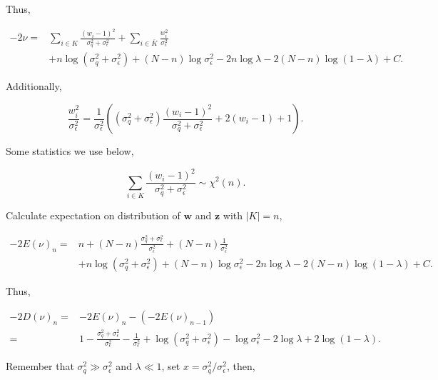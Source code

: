 Thus, 

\begin{equation}
\begin{aligned}
    -2\nu =& \sum_{i\in K}\frac{(w_i - 1)^2}{\sigma_q^2+\sigma_\epsilon^2} + \sum_{i\in \bar{K}}\frac{w_i^2}{\sigma_\epsilon^2} \\ 
    &+ n\log(\sigma_q^2+\sigma_\epsilon^2) + (N-n)\log\sigma_\epsilon^2 - 2n\log\lambda - 2(N-n)\log(1-\lambda) + C.
\end{aligned}
\end{equation}

Additionally, 

\begin{equation}
    \frac{w_i^2}{\sigma_\epsilon^2} = \frac{1}{\sigma_\epsilon^2}\left((\sigma_q^2+\sigma_\epsilon^2)\frac{(w_i - 1)^2}{\sigma_q^2+\sigma_\epsilon^2} + 2(w_i - 1) + 1\right).
\end{equation}

Some statistics we use below,

\begin{equation}
    \sum_{i\in K}\frac{(w_i - 1)^2}{\sigma_q^2+\sigma_\epsilon^2} \sim \chi^2(n).
\end{equation}

Calculate expectation on distribution of $\bm{w}$ and $\bm{z}$ with $|K|=n$, 

\begin{equation}
\begin{aligned}
    -2E(\nu)_n =& n + (N - n)\frac{\sigma_q^2+\sigma_\epsilon^2}{\sigma_\epsilon^2} + (N - n)\frac{1}{\sigma_\epsilon^2} \\ 
    &+ n\log(\sigma_q^2+\sigma_\epsilon^2) + (N-n)\log\sigma_\epsilon^2 - 2n\log\lambda - 2(N-n)\log(1-\lambda) + C.
\end{aligned}
\end{equation}

Thus, 

\begin{equation}
\begin{aligned}
    -2D(\nu)_n =& -2E(\nu)_n - (-2E(\nu)_{n-1}) \\ 
    =& 1 - \frac{\sigma_q^2+\sigma_\epsilon^2}{\sigma_\epsilon^2} - \frac{1}{\sigma_\epsilon^2} + \log(\sigma_q^2+\sigma_\epsilon^2) - \log\sigma_\epsilon^2 - 2\log\lambda + 2\log(1-\lambda).
\end{aligned}
\end{equation}

Remember that $\sigma_q^2 \gg \sigma_\epsilon^2$ and $\lambda \ll 1$, set $x=\sigma_q^2/\sigma_\epsilon^2$, then,

